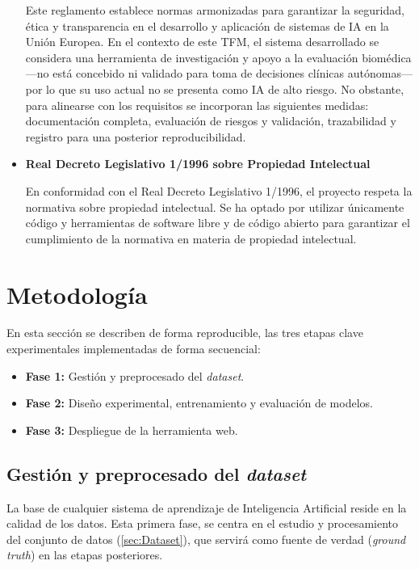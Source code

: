 \documentclass[12pt,a4paper,onecolumn,oneside]{report}
\begin{document}
\begin{itemize}
    Este reglamento establece normas armonizadas para garantizar la seguridad, ética y transparencia en el desarrollo y aplicación de sistemas de IA en la Unión Europea.  
    En el contexto de este TFM, el sistema desarrollado se considera una herramienta de investigación y apoyo a la evaluación biomédica —no está concebido ni validado para toma de decisiones clínicas autónomas— 
    por lo que su uso actual no se presenta como IA de alto riesgo. No obstante, para alinearse con los requisitos se incorporan las siguientes medidas: documentación completa, evaluación de riesgos y validación, 
    trazabilidad y registro para una posterior reproducibilidad.
    
    \item \textbf{Real Decreto Legislativo 1/1996 sobre Propiedad Intelectual}\cite{RDL1996}
    
    En conformidad con el Real Decreto Legislativo 1/1996, el proyecto respeta la normativa sobre propiedad intelectual. Se ha optado por utilizar 
    únicamente código y herramientas de software libre y de código abierto para garantizar el cumplimiento de la normativa en materia de propiedad 
    intelectual.

\end{itemize}


\chapter{Metodología} %
\label{metodologia}

En esta sección se describen de forma reproducible, las tres etapas clave experimentales implementadas de forma secuencial: 
\begin{itemize}
  \item \textbf{Fase 1:} Gestión y preprocesado del \textit{dataset}.
  \item \textbf{Fase 2:} Diseño experimental, entrenamiento y evaluación de modelos.
  \item \textbf{Fase 3:} Despliegue de la herramienta web.
\end{itemize}

\section{Gestión y preprocesado del \textit{dataset}}
\label{Gestión y preprocesado del dataset}

La base de cualquier sistema de aprendizaje de Inteligencia Artificial reside en la calidad de los datos. Esta primera fase, se centra en el estudio y procesamiento del conjunto de datos (\autoref{sec:Dataset}), que servirá como
fuente de verdad (\textit{ground truth}) en las etapas posteriores.
\end{document}

